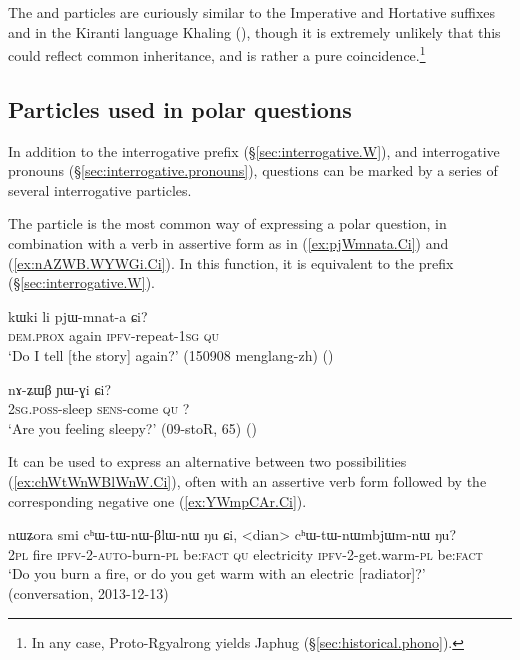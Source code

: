 The  and  particles are curiously similar to the Imperative and Hortative suffixes  and  in the Kiranti language Khaling (\citealt[1114--1123]{jacques12khaling}), though it is extremely unlikely that this could reflect common inheritance, and is rather a pure coincidence.\footnote{In any case, Proto-Rgyalrong  yields Japhug  (§\ref{sec:historical.phono}). }


\subsection{Particles used in polar questions} \label{sec:fsp.interrog}
In addition to the interrogative prefix  (§\ref{sec:interrogative.W}), and interrogative pronouns (§\ref{sec:interrogative.pronouns}), questions can be marked by a series of several interrogative particles.

The particle  is the most common way of expressing a polar question, in combination with a verb in assertive form as in (\ref{ex:pjWmnata.Ci}) and (\ref{ex:nAZWB.WYWGi.Ci}). In this function, it is equivalent to the prefix  (§\ref{sec:interrogative.W}).

\begin{exe}
\ex \label{ex:pjWmnata.Ci}
\gll kɯki li pjɯ-mnat-a ɕi? \\
\textsc{dem}.\textsc{prox} again \textsc{ipfv}-repeat-\textsc{1sg} \textsc{qu} \\
\glt `Do I tell [the story] again?' (150908 menglang-zh) ()
\end{exe}

\begin{exe}
\ex \label{ex:nAZWB.WYWGi.Ci}
\gll nɤ-ʑɯβ ɲɯ-ɣi ɕi? \\
\textsc{2sg}.\textsc{poss}-sleep \textsc{sens}-come \textsc{qu} ? \\
\glt `Are you feeling sleepy?' (09-stoR,  65) ()
\end{exe}

It can be used to express an alternative between two possibilities (\ref{ex:chWtWnWBlWnW.Ci}), often with an assertive verb form followed by the corresponding negative one (\ref{ex:YWmpCAr.Ci}).

\begin{exe}
\ex \label{ex:chWtWnWBlWnW.Ci}
\gll nɯʑora smi cʰɯ-tɯ-nɯ-βlɯ-nɯ ŋu ɕi, <dian> cʰɯ-tɯ-nɯmbjɯm-nɯ ŋu? \\
\textsc{2pl} fire \textsc{ipfv}-2-\textsc{auto}-burn-\textsc{pl} be:\textsc{fact} \textsc{qu} electricity \textsc{ipfv}-2-get.warm-\textsc{pl} be:\textsc{fact} \\
\glt `Do you burn a fire, or do you get warm with an electric [radiator]?' (conversation, 2013-12-13)
\end{exe}

